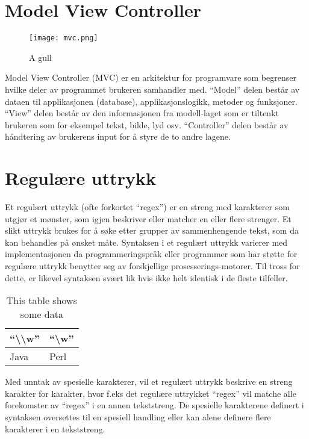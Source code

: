 \documentclass[../main.tex]{subfiles}
\begin{document}
\section{Model View Controller}
\begin{wrapfigure}{r}{0.5\textwidth}
  \begin{center}
    \texttt{[image: mvc.png]}
  \end{center}
  \caption{A gull}
\end{wrapfigure}
Model View Controller (MVC) er en arkitektur for programvare som begrenser hvilke deler av programmet brukeren samhandler med. “Model” delen består av dataen til applikasjonen (database), applikasjonslogikk, metoder og funksjoner. “View” delen består av den informasjonen fra modell-laget som er tiltenkt brukeren som for eksempel tekst, bilde, lyd osv. “Controller” delen består av håndtering av brukerens input for å styre de to andre lagene. 

\section{Regulære uttrykk}
Et regulært uttrykk (ofte forkortet “regex”) er en streng med karakterer som utgjør et mønster, som igjen beskriver eller matcher en eller flere strenger. Et slikt uttrykk brukes for å søke etter grupper av sammenhengende tekst, som da kan behandles på ønsket måte. Syntaksen i et regulært uttrykk varierer med implementasjonen da programmeringspråk eller programmer som har støtte for regulære uttrykk benytter seg av forskjellige prosesserings-motorer. Til tross for dette, er likevel syntaksen svært lik hvis ikke helt identisk i de fleste tilfeller.


\begin{table}
\begin{center}
\caption{This table shows some data}
  \begin{tabular}{ | p{5cm} | p{5cm} |}
    \hline
    “\textbackslash \textbackslash w” & “\textbackslash w” \\ \hline
    Java & Perl \\
    \hline
  \end{tabular}
\end{center}
\end{table}

Med unntak av spesielle karakterer, vil et regulært uttrykk beskrive en streng karakter for karakter, hvor f.eks det regulære uttrykket “regex” vil matche alle forekomster av “regex” i en annen tekststreng. De spesielle karakterene definert i syntaksen oversettes til en spesiell handling eller kan alene definere flere karakterer i en tekststreng. 
\end{document}
